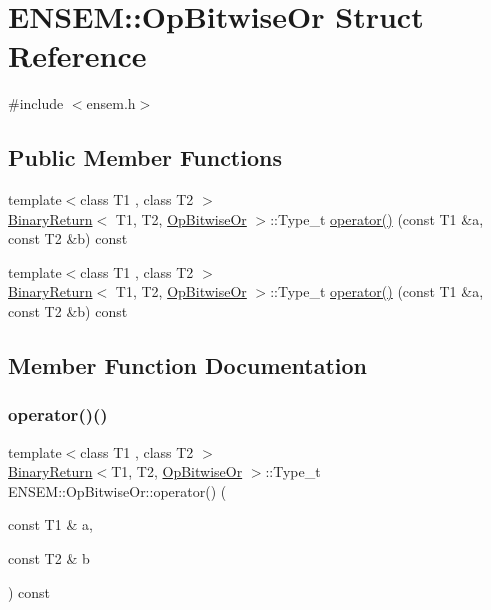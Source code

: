 \hypertarget{structENSEM_1_1OpBitwiseOr}{}\section{E\+N\+S\+EM\+:\+:Op\+Bitwise\+Or Struct Reference}
\label{structENSEM_1_1OpBitwiseOr}


{\ttfamily \#include $<$ensem.\+h$>$}

\subsection*{Public Member Functions}
\begin{DoxyCompactItemize}
\item 
{\footnotesize template$<$class T1 , class T2 $>$ }\\\mbox{\hyperlink{structENSEM_1_1BinaryReturn}{Binary\+Return}}$<$ T1, T2, \mbox{\hyperlink{structENSEM_1_1OpBitwiseOr}{Op\+Bitwise\+Or}} $>$\+::Type\+\_\+t \mbox{\hyperlink{structENSEM_1_1OpBitwiseOr_ad773d2df54ccbb80a46a0cd83b9ce226}{operator()}} (const T1 \&a, const T2 \&b) const
\item 
{\footnotesize template$<$class T1 , class T2 $>$ }\\\mbox{\hyperlink{structENSEM_1_1BinaryReturn}{Binary\+Return}}$<$ T1, T2, \mbox{\hyperlink{structENSEM_1_1OpBitwiseOr}{Op\+Bitwise\+Or}} $>$\+::Type\+\_\+t \mbox{\hyperlink{structENSEM_1_1OpBitwiseOr_ad773d2df54ccbb80a46a0cd83b9ce226}{operator()}} (const T1 \&a, const T2 \&b) const
\end{DoxyCompactItemize}


\subsection{Member Function Documentation}
\mbox{\label{structENSEM_1_1OpBitwiseOr_ad773d2df54ccbb80a46a0cd83b9ce226}} 
\subsubsection{\texorpdfstring{operator()()}{operator()()}\hspace{0.1cm}{\footnotesize\ttfamily [1/2]}}
{\footnotesize\ttfamily template$<$class T1 , class T2 $>$ \\
\mbox{\hyperlink{structENSEM_1_1BinaryReturn}{Binary\+Return}}$<$T1, T2, \mbox{\hyperlink{structENSEM_1_1OpBitwiseOr}{Op\+Bitwise\+Or}} $>$\+::Type\+\_\+t E\+N\+S\+E\+M\+::\+Op\+Bitwise\+Or\+::operator() (\begin{DoxyParamCaption}\item[{const T1 \&}]{a,  }\item[{const T2 \&}]{b }\end{DoxyParamCaption}) const\hspace{0.3cm}{\ttfamily [inline]}}

